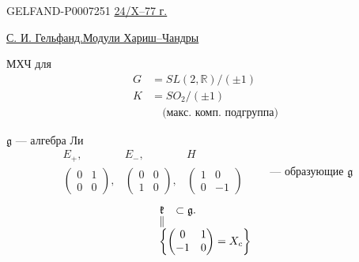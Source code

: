 \begin{GelfandAdjacentEvidence}{GELFAND-P000725}{1}
\underline{24/X--77 г.}

\underline{С. И. Гельфанд.}\qquad\underline{Модули Хариш--Чандры}

МХЧ для
\[
\begin{aligned}
G&=SL(2,\mathbb R)/(\pm1)\\
K&=SO_2/(\pm1)\\[-.25ex]
 &\quad\text{(макс. комп. подгруппа)}
\end{aligned}
\]

\(\mathfrak g\) --- алгебра Ли
\[
\begin{array}{ccc}
E_+,&E_-,&H\\[.4ex]
\begin{pmatrix}0&1\\0&0\end{pmatrix},&
\begin{pmatrix}0&0\\1&0\end{pmatrix},&
\begin{pmatrix}1&0\\0&-1\end{pmatrix}
\end{array}
\qquad\text{--- образующие }\mathfrak g
\]
\[
\begin{array}{cl}
\mathfrak k&\subset\mathfrak g.\\[-.5ex]
\Vert&\\
\multicolumn{2}{l}{\left\{\begin{pmatrix}0&1\\-1&0\end{pmatrix}=X_c\right\}}
\end{array}
\]
\end{GelfandAdjacentEvidence}



